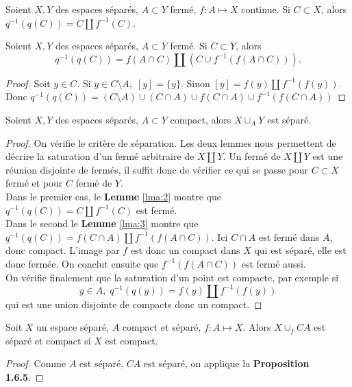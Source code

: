 \documentclass[main.tex]{subfiles}
\begin{document}
	\begin{lemma}
		\label{lma:2}
		Soient $X,Y$ des espaces séparés, $A\subset Y$ fermé, $f : A \longmapsto X$ continue. Si $C \subset X$, alors $q^{-1}(q(C)) = C \amalg f^{-1}(C)$. 
	\end{lemma}
	\begin{lemma}
		\label{lma:3}
		Soient $X,Y$ des espaces séparés,  $A\subset Y$ fermé. Si $C \subset Y$, alors \[q^{-1}(q(C)) = f(A\cap C) \amalg (C \cup f^{-1}(f(A\cap C))).\]
	\end{lemma}
	\begin{proof}
		Soit $y \in C$. Si $y\in C \setminus A, \; [y] = \{y\}$. Sinon $[y] = f(y) \amalg f^{-1}(f(y))$. Donc $q^{-1}(q(C)) = (C\setminus A) \cup (C \cap A) \cup f(C\cap A) \cup f^{-1}(f(C\cap A))$ 	
	\end{proof}
	\begin{prop}
		Soient $X,Y$ des espaces séparés,  $A\subset Y$ compact, alors $X \cup_A Y$ est séparé.
	\end{prop}
	\begin{proof}
		On vérifie le critère de séparation. Les deux lemmes nous permettent de décrire la saturation d'un fermé arbitraire de $X \coprod Y$. Un fermé de  $X \coprod Y$ est une réunion disjointe de fermés, il suffit donc de vérifier ce qui se passe pour $C \subset X$ fermé et pour $C$ fermé de  $Y$.\\ 
		Dans le premier cas, le \textbf{Lemme} \ref{lma:2} montre que $q^{-1}(q(C)) = C \amalg f^{-1}(C)$ est fermé. \\
		Dans le second le \textbf{Lemme} \ref{lma:3} montre que $q^{-1}(q(C)) =f(C\cap A) \amalg f^{-1}(f(A\cap C))$. Ici $C\cap A$ est fermé dans $A$, donc compact. L'image par $f$ est donc un compact dans $X$ qui est séparé, elle est donc fermée. On conclut ensuite que $f^{-1}(f(A\cap C))$ est fermé aussi. \\ 
	On vérifie finalement que la saturation d'un point est compacte, par exemple si \[y \in A, \; q^{-1}(q(y)) = f(y) \amalg f^{-1}(f(y))\] qui est une union disjointe de compacts donc un compact.
	\end{proof}
	
	\begin{cor}
		Soit $X$ un espace séparé, $A$ compact et séparé, $f : A\longmapsto X$. Alors $X \cup_f CA$ est séparé et compact si $X$ est compact.
	\end{cor}
	\begin{proof}
		Comme $A$ est séparé, $CA$ est séparé, on applique la \textbf{Proposition 1.6.5}.
	\end{proof}
\end{document}
